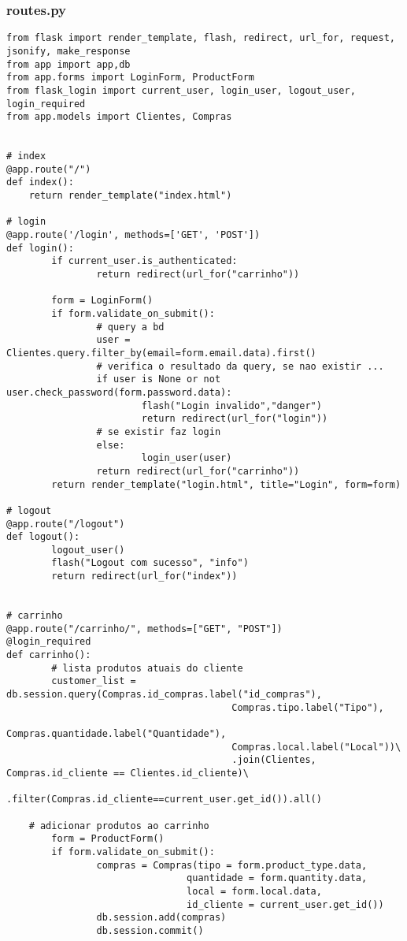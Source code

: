 \documentclass{report}
\begin{document}
\subsubsection{routes.py}
\begin{lstlisting}
from flask import render_template, flash, redirect, url_for, request, jsonify, make_response
from app import app,db
from app.forms import LoginForm, ProductForm
from flask_login import current_user, login_user, logout_user, login_required
from app.models import Clientes, Compras


# index
@app.route("/")
def index():
    return render_template("index.html")

# login
@app.route('/login', methods=['GET', 'POST'])
def login():
        if current_user.is_authenticated:
                return redirect(url_for("carrinho"))

        form = LoginForm()
        if form.validate_on_submit():
                # query a bd
                user = Clientes.query.filter_by(email=form.email.data).first()
                # verifica o resultado da query, se nao existir ...
                if user is None or not user.check_password(form.password.data):
                        flash("Login invalido","danger")
                        return redirect(url_for("login"))
                # se existir faz login
                else:
                        login_user(user)
                return redirect(url_for("carrinho"))
        return render_template("login.html", title="Login", form=form)

# logout
@app.route("/logout")
def logout():
        logout_user()
        flash("Logout com sucesso", "info")
        return redirect(url_for("index"))


# carrinho
@app.route("/carrinho/", methods=["GET", "POST"])
@login_required
def carrinho():
        # lista produtos atuais do cliente
        customer_list = db.session.query(Compras.id_compras.label("id_compras"),
                                        Compras.tipo.label("Tipo"),
                                        Compras.quantidade.label("Quantidade"),
                                        Compras.local.label("Local"))\
                                        .join(Clientes, Compras.id_cliente == Clientes.id_cliente)\
                                        .filter(Compras.id_cliente==current_user.get_id()).all()

    # adicionar produtos ao carrinho
        form = ProductForm()
        if form.validate_on_submit():
                compras = Compras(tipo = form.product_type.data,
                                quantidade = form.quantity.data,
                                local = form.local.data,
                                id_cliente = current_user.get_id())
                db.session.add(compras)
                db.session.commit()


\end{lstlisting}
\end{document}
